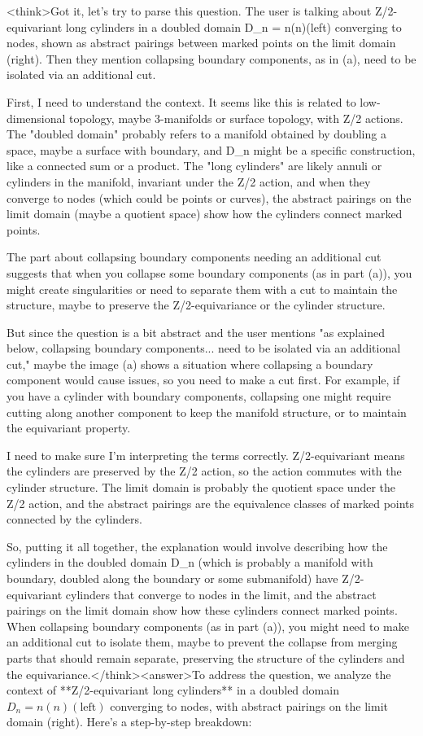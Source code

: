 <think>Got it, let's try to parse this question. The user is talking about Z/2-equivariant long cylinders in a doubled domain D_n = n(n)(left) converging to nodes, shown as abstract pairings between marked points on the limit domain (right). Then they mention collapsing boundary components, as in (a), need to be isolated via an additional cut.

First, I need to understand the context. It seems like this is related to low-dimensional topology, maybe 3-manifolds or surface topology, with Z/2 actions. The "doubled domain" probably refers to a manifold obtained by doubling a space, maybe a surface with boundary, and D_n might be a specific construction, like a connected sum or a product. The "long cylinders" are likely annuli or cylinders in the manifold, invariant under the Z/2 action, and when they converge to nodes (which could be points or curves), the abstract pairings on the limit domain (maybe a quotient space) show how the cylinders connect marked points.

The part about collapsing boundary components needing an additional cut suggests that when you collapse some boundary components (as in part (a)), you might create singularities or need to separate them with a cut to maintain the structure, maybe to preserve the Z/2-equivariance or the cylinder structure.

But since the question is a bit abstract and the user mentions "as explained below, collapsing boundary components... need to be isolated via an additional cut," maybe the image (a) shows a situation where collapsing a boundary component would cause issues, so you need to make a cut first. For example, if you have a cylinder with boundary components, collapsing one might require cutting along another component to keep the manifold structure, or to maintain the equivariant property.

I need to make sure I'm interpreting the terms correctly. Z/2-equivariant means the cylinders are preserved by the Z/2 action, so the action commutes with the cylinder structure. The limit domain is probably the quotient space under the Z/2 action, and the abstract pairings are the equivalence classes of marked points connected by the cylinders.

So, putting it all together, the explanation would involve describing how the cylinders in the doubled domain D_n (which is probably a manifold with boundary, doubled along the boundary or some submanifold) have Z/2-equivariant cylinders that converge to nodes in the limit, and the abstract pairings on the limit domain show how these cylinders connect marked points. When collapsing boundary components (as in part (a)), you might need to make an additional cut to isolate them, maybe to prevent the collapse from merging parts that should remain separate, preserving the structure of the cylinders and the equivariance.</think><answer>To address the question, we analyze the context of **Z/2-equivariant long cylinders** in a doubled domain \( D_n = n(n)(\text{left}) \) converging to nodes, with abstract pairings on the limit domain (right). Here’s a step-by-step breakdown:  

